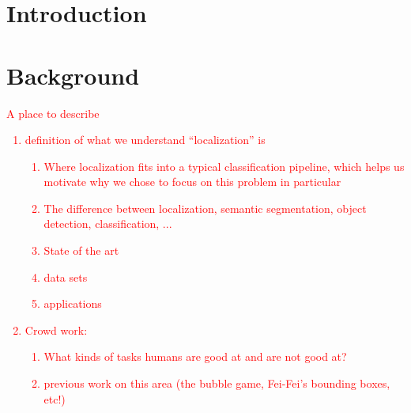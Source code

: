 \documentclass[10pt,twocolumn,letterpaper]{article}
\newcommand{\preliminary}[1]{\textcolor{red}{#1}}
\newcommand{\todo}{\colorbox{yellow}{\fbox{\LARGE{TODO}}}}
\begin{document}
\section{Introduction}
\todo

\section{Background}
\preliminary{
\todo A place to describe
\begin{enumerate}
\item definition of what we understand ``localization'' is
  \begin{enumerate}
    \item Where localization fits into a typical classification pipeline, which helps us motivate why we chose to focus on this problem in particular
    \item The difference between localization, semantic segmentation, object detection, classification, ...
    \item State of the art
    \item data sets
    \item applications
\end{enumerate}
\item Crowd work:
\begin{enumerate}
  \item What kinds of tasks humans are good at and are not good at?
  \item previous work on this area (the bubble game, Fei-Fei's bounding boxes, etc!)
\end{enumerate}
\end{enumerate}
}

\end{document}
